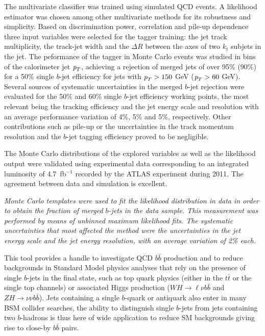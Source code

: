 The multivariate classifier was trained using simulated QCD events. A likelihood estimator was chosen among other multivariate methods for its robustness and simplicity.  Based on discrimination power, correlation and pile-up dependence three input variables were selected for the tagger training: the jet track multiplicity, the track-jet width and the $\Delta R$ between the axes of two $k_t$ subjets in the jet. 
 The peformance of the tagger in Monte Carlo events was studied in bins of the calorimeter jet ${\emph{p}_{T}}$, achieving a rejection of merged jets of over 95\% (90\%) for a 50\% single $b$-jet efficiency for jets with ${\emph{p}_{T}}>150$ GeV (${\emph{p}_{T}}>60$ GeV).
Several sources of systematic uncertainties in the merged $b$-jet rejection were evaluated for the 50\% and 60\% single $b$-jet efficiency working points, the most relevant being the tracking efficiency and the jet energy scale and resolution with an average performance variation of 4\%, 5\% and 5\%, respectively. Other contributions such as pile-up or the uncertainties in the track momentum resolution and the $b$-jet tagging efficiency proved to be negligible.


The Monte Carlo distributions of the explored variables as well as the likelihood output were validated using experimental data corresponding to an integrated luminosity of 4.7~fb$^{-1}$ recorded by the ATLAS experiment during 2011. The agreement between data and simulation is excellent.

\emph{Monte Carlo templates were used to fit the likelihood distribution in data in order to obtain the fraction of merged $b$-jets in the data sample. This measurement was performed by means of unbinned maximum likelihood fits. The systematic uncertainties that most affected the method were the uncertainties in the jet energy scale and the jet energy resolution, with an average variation of 2\% each.}


This tool provides a handle to investigate QCD $b\bar{b}$ production and to reduce backgrounds in %
 Standard Model physics analyses that rely on the presence of single $b$-jets in the final state, such as top quark physics (either in the $t\bar{t}$ or the single top channels) or associated Higgs production ($WH\rightarrow\ell\nu b\bar{b}$ and $ZH\rightarrow\nu\nu b\bar{b}$). %
 Jets containing a single $b$-quark or antiquark %
also enter in many BSM collider searches, the ability to distinguish single $b$-jets from jets containing two $b$-hadrons is thus here of wide application to reduce SM backgrounds giving rise to close-by $b\bar{b}$ pairs.

